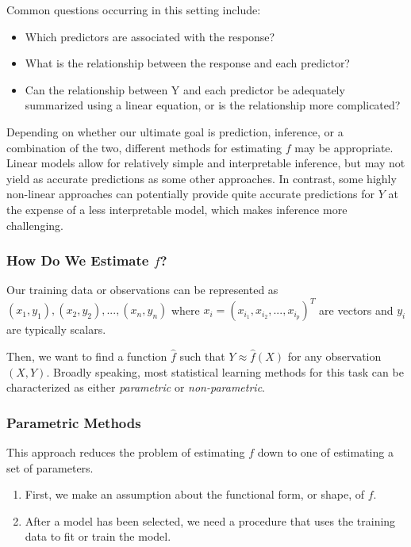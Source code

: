 \documentclass{article}
\numberwithin{equation}{section}
\begin{document}
Common questions occurring in this setting include:
\begin{itemize}
    \item Which predictors are associated with the response?
    \item What is the relationship between the response and each predictor?
    \item Can the relationship between Y and each predictor be adequately summarized using a linear equation, or is the relationship more complicated? 
\end{itemize}

Depending on whether our ultimate goal is prediction, inference, or a combination of the two, different methods for estimating $f$ may be appropriate. Linear models allow for relatively simple and interpretable inference, but may not yield as accurate predictions as some other approaches. In contrast, some highly non-linear approaches can potentially provide quite accurate predictions for $Y$ at the expense of a less interpretable model, which makes inference more challenging.

\subsubsection{How Do We Estimate \texorpdfstring{$f$}{f}?}

Our training data or observations can be represented as ${(x_1, y_1),(x_2, y_2),...,(x_n, y_n)}$ where $x_i = (x_{i_1}, x_{i_2},...,x_{i_p})^T$ are vectors and $y_i$ are typically scalars.

Then, we want to find a function $\hat f$ such that $Y \approx \hat f(X)$ for any observation $(X, Y)$. Broadly speaking, most statistical learning methods for this task can be characterized as either \textit{parametric} or \textit{non-parametric}.

\subsubsection*{Parametric Methods}

This approach reduces the problem of estimating $f$ down to one of estimating a set of parameters.

\begin{enumerate}
    \item First, we make an assumption about the functional form, or shape, of $f$.
    
    \item After a model has been selected, we need a procedure that uses the training data to fit or train the model.
\end{enumerate}
\end{document}
